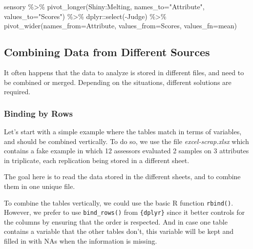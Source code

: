 \documentclass[
]{book}
\newenvironment{Shaded}{\begin{snugshade}}{\end{snugshade}}
\newcommand{\AttributeTok}[1]{\textcolor[rgb]{0.77,0.63,0.00}{#1}}
\newcommand{\FunctionTok}[1]{\textcolor[rgb]{0.00,0.00,0.00}{#1}}
\newcommand{\NormalTok}[1]{#1}
\newcommand{\SpecialCharTok}[1]{\textcolor[rgb]{0.00,0.00,0.00}{#1}}
\newcommand{\StringTok}[1]{\textcolor[rgb]{0.31,0.60,0.02}{#1}}
\begin{document}
\begin{Shaded}
\begin{Highlighting}[]
\NormalTok{sensory }\SpecialCharTok{\%\textgreater{}\%} 
  \FunctionTok{pivot\_longer}\NormalTok{(Shiny}\SpecialCharTok{:}\NormalTok{Melting, }\AttributeTok{names\_to=}\StringTok{"Attribute"}\NormalTok{, }\AttributeTok{values\_to=}\StringTok{"Scores"}\NormalTok{) }\SpecialCharTok{\%\textgreater{}\%} 
\NormalTok{  dplyr}\SpecialCharTok{::}\FunctionTok{select}\NormalTok{(}\SpecialCharTok{{-}}\NormalTok{Judge) }\SpecialCharTok{\%\textgreater{}\%} 
  \FunctionTok{pivot\_wider}\NormalTok{(}\AttributeTok{names\_from=}\NormalTok{Attribute, }\AttributeTok{values\_from=}\NormalTok{Scores, }\AttributeTok{values\_fn=}\NormalTok{mean)}
\end{Highlighting}
\end{Shaded}

\hypertarget{combining-data-from-different-sources}{%
\subsection{Combining Data from Different Sources}\label{combining-data-from-different-sources}}

It often happens that the data to analyze is stored in different files, and need to be combined or merged. Depending on the situations, different solutions are required.

\hypertarget{binding-by-rows}{%
\subsubsection{Binding by Rows}\label{binding-by-rows}}

Let's start with a simple example where the tables match in terms of variables, and should be combined vertically.
To do so, we use the file \emph{excel-scrap.xlsx} which contains a fake example in which 12 assessors evaluated 2 samples on 3 attributes in triplicate, each replication being stored in a different sheet.

The goal here is to read the data stored in the different sheets, and to combine them in one unique file.

To combine the tables vertically, we could use the basic R function \texttt{rbind()}. However, we prefer to use \texttt{bind\_rows()} from \texttt{\{dplyr\}} since it better controls for the columns by ensuring that the order is respected. And in case one table contains a variable that the other tables don't, this variable will be kept and filled in with NAs when the information is missing.
\end{document}

